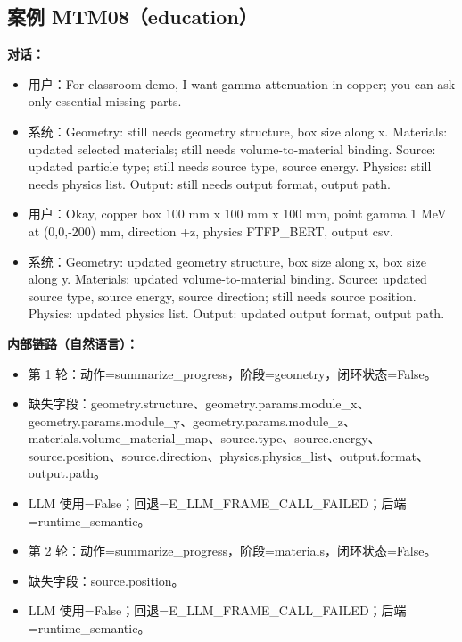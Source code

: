 \documentclass[11pt]{ctexart}
\begin{document}
\subsection{案例 MTM08（education）}
\textbf{对话：}
\begin{itemize}
\item 用户：For classroom demo, I want gamma attenuation in copper; you can ask only essential missing parts.
\item 系统：Geometry: still needs geometry structure, box size along x. Materials: updated selected materials; still needs volume-to-material binding. Source: updated particle type; still needs source type, source energy. Physics: still needs physics list. Output: still needs output format, output path.
\item 用户：Okay, copper box 100 mm x 100 mm x 100 mm, point gamma 1 MeV at (0,0,-200) mm, direction +z, physics FTFP\_BERT, output csv.
\item 系统：Geometry: updated geometry structure, box size along x, box size along y. Materials: updated volume-to-material binding. Source: updated source type, source energy, source direction; still needs source position. Physics: updated physics list. Output: updated output format, output path.
\end{itemize}
\textbf{内部链路（自然语言）：}
\begin{itemize}
\item 第 1 轮：动作=summarize\_progress，阶段=geometry，闭环状态=False。
\item 缺失字段：geometry.structure、geometry.params.module\_x、geometry.params.module\_y、geometry.params.module\_z、materials.volume\_material\_map、source.type、source.energy、source.position、source.direction、physics.physics\_list、output.format、output.path。
\item LLM 使用=False；回退=E\_LLM\_FRAME\_CALL\_FAILED；后端=runtime\_semantic。
\item 第 2 轮：动作=summarize\_progress，阶段=materials，闭环状态=False。
\item 缺失字段：source.position。
\item LLM 使用=False；回退=E\_LLM\_FRAME\_CALL\_FAILED；后端=runtime\_semantic。
\end{itemize}
\end{document}
